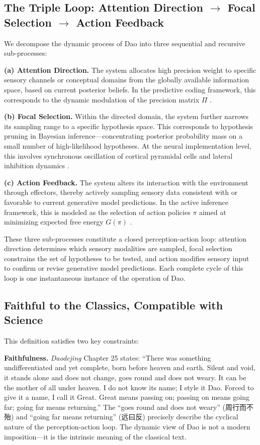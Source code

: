 \documentclass[11pt,a4paper]{article}
\begin{document}
\subsection{The Triple Loop: Attention Direction $\rightarrow$ Focal Selection $\rightarrow$ Action Feedback}

We decompose the dynamic process of Dao into three sequential and recursive sub-processes:

\textbf{(a) Attention Direction.} The system allocates high precision weight to specific sensory channels or conceptual domains from the globally available information space, based on current posterior beliefs. In the predictive coding framework, this corresponds to the dynamic modulation of the precision matrix $\Pi$ \cite{Feldman2010}.

\textbf{(b) Focal Selection.} Within the directed domain, the system further narrows its sampling range to a specific hypothesis space. This corresponds to hypothesis pruning in Bayesian inference---concentrating posterior probability mass on a small number of high-likelihood hypotheses. At the neural implementation level, this involves synchronous oscillation of cortical pyramidal cells and lateral inhibition dynamics \cite{Bastos2012}.

\textbf{(c) Action Feedback.} The system alters its interaction with the environment through effectors, thereby actively sampling sensory data consistent with or favorable to current generative model predictions. In the active inference framework, this is modeled as the selection of action policies $\pi$ aimed at minimizing expected free energy $G(\pi)$ \cite{Friston2017}.

These three sub-processes constitute a closed perception-action loop: attention direction determines which sensory modalities are sampled, focal selection constrains the set of hypotheses to be tested, and action modifies sensory input to confirm or revise generative model predictions. Each complete cycle of this loop is one instantaneous instance of the operation of Dao.

\subsection{Faithful to the Classics, Compatible with Science}

This definition satisfies two key constraints:

\textbf{Faithfulness.} \textit{Daodejing} Chapter 25 states: ``There was something undifferentiated and yet complete, born before heaven and earth. Silent and void, it stands alone and does not change, goes round and does not weary. It can be the mother of all under heaven. I do not know its name; I style it Dao. Forced to give it a name, I call it Great. Great means passing on; passing on means going far; going far means returning.'' The ``goes round and does not weary'' (周行而不殆) and ``going far means returning'' (远曰反) precisely describe the cyclical nature of the perception-action loop. The dynamic view of Dao is not a modern imposition---it is the intrinsic meaning of the classical text.
\end{document}
